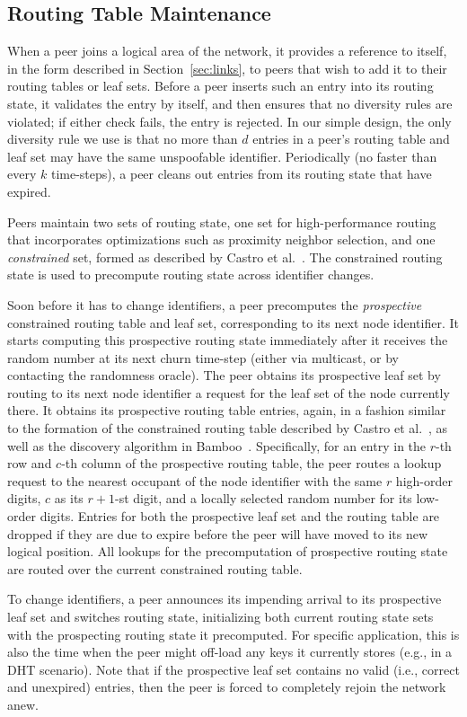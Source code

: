 \subsection{Routing Table Maintenance}
\label{sec:routing_state}
When a peer joins a logical area of the network, it provides a reference
to itself, in the form described in Section~\ref{sec:links}, to peers
that wish to add it to their routing tables or leaf sets.
Before a peer inserts such an entry into its routing state, it validates
the entry by itself, and then ensures that no diversity rules are
violated; if either check fails, the entry is rejected.  In our simple
design, the only diversity rule we use is that no more than $d$ entries
in a peer's routing table and leaf set may have the same unspoofable
identifier.
Periodically (no faster than every $k$ time-steps), a peer cleans out
entries from its routing state that have expired.

Peers maintain two sets of routing state, one set for high-performance
routing that incorporates optimizations such as proximity neighbor
selection, and one \emph{constrained} set, formed as described by Castro
et al.~\cite{Castro2002short}.  The constrained routing state is used to
precompute routing state across identifier changes.


Soon before it has to change identifiers, a peer precomputes the 
\emph{prospective} constrained routing table and leaf set, corresponding
to its next
node identifier.  It starts computing this prospective routing state
immediately after it receives the random number at its next churn
time-step (either via multicast, or by contacting the randomness
oracle).  The peer obtains its prospective leaf set by routing to its
next node identifier a request for the leaf set of the node currently
there.  It obtains its prospective routing table entries, again,  in a fashion similar to the
formation of the constrained routing table described by Castro et
al.~\cite{Castro2002short}, as well as the discovery algorithm in
Bamboo~\cite{Rhea2004short}.  Specifically, for an entry in the $r$-th
row and $c$-th column of the prospective routing table, the peer routes
a lookup request to the nearest occupant of the node identifier with the
same $r$ high-order digits, $c$ as its $r+1$-st digit, and a locally
selected random number for its low-order digits. Entries for both the
prospective leaf set and the routing table are dropped if they are due
to expire before the peer will have moved to its new logical position. 
All lookups for the precomputation of prospective routing state are
routed over the current constrained routing table.

To change identifiers, a peer announces its impending arrival to its
prospective leaf set and switches routing state, initializing both
current routing state sets with the prospecting routing state it
precomputed.  For specific application, this is also the time when the
peer might off-load any keys it currently stores (e.g., in a DHT
scenario).  Note that if the prospective leaf set contains no valid
(i.e., correct and unexpired) entries, then the peer is forced to
completely rejoin the network anew.



